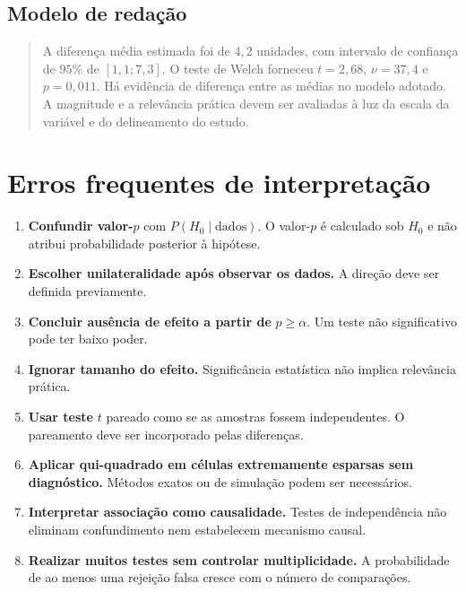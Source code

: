 \documentclass[
  letterpaper,
  DIV=11,
  numbers=noendperiod]{scrreprt}
\providecommand{\tightlist}{%
  \setlength{\itemsep}{0pt}\setlength{\parskip}{0pt}}\usepackage{longtable,booktabs,array}
\begin{document}
\subsection{Modelo de redação}\label{modelo-de-redauxe7uxe3o}

\begin{quote}
A diferença média estimada foi de \(4{,}2\) unidades, com intervalo de
confiança de \(95\%\) de \([1{,}1;7{,}3]\). O teste de Welch forneceu
\(t=2{,}68\), \(\nu=37{,}4\) e \(p=0{,}011\). Há evidência de diferença
entre as médias no modelo adotado. A magnitude e a relevância prática
devem ser avaliadas à luz da escala da variável e do delineamento do
estudo.
\end{quote}

\section{Erros frequentes de
interpretação}\label{erros-frequentes-de-interpretauxe7uxe3o}

\begin{enumerate}
\def\labelenumi{\arabic{enumi}.}
\tightlist
\item
  \textbf{Confundir valor-}\(p\) com \(P(H_0\mid\text{dados})\). O
  valor-\(p\) é calculado sob \(H_0\) e não atribui probabilidade
  posterior à hipótese.
\item
  \textbf{Escolher unilateralidade após observar os dados.} A direção
  deve ser definida previamente.
\item
  \textbf{Concluir ausência de efeito a partir de} \(p\geq\alpha\). Um
  teste não significativo pode ter baixo poder.
\item
  \textbf{Ignorar tamanho do efeito.} Significância estatística não
  implica relevância prática.
\item
  \textbf{Usar teste} \(t\) pareado como se as amostras fossem
  independentes. O pareamento deve ser incorporado pelas diferenças.
\item
  \textbf{Aplicar qui-quadrado em células extremamente esparsas sem
  diagnóstico.} Métodos exatos ou de simulação podem ser necessários.
\item
  \textbf{Interpretar associação como causalidade.} Testes de
  independência não eliminam confundimento nem estabelecem mecanismo
  causal.
\item
  \textbf{Realizar muitos testes sem controlar multiplicidade.} A
  probabilidade de ao menos uma rejeição falsa cresce com o número de
  comparações.
\end{enumerate}
\end{document}
